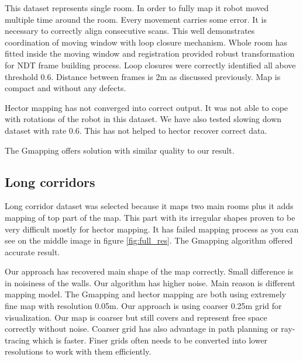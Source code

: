 This dataset represents single room. In order to fully map it robot moved multiple time around the room. Every movement carries some error. It is necessary to correctly align consecutive scans. This well demonstrates coordination of moving window with loop closure mechanism. Whole room has fitted inside the moving window and registration provided robust transformation for \gls{NDT} frame building process. Loop closures were correctly identified all above threshold 0.6. Distance between frames is 2m as discussed previously. Map is compact and without any defects.

Hector mapping has not converged into correct output. It was not able to cope with rotations of the robot in this dataset. We have also tested slowing down dataset with rate 0.6. This has not helped to hector recover correct data.

The Gmapping offers  solution with similar quality to our result. 

\newpage
\subsection{Long corridors}
Long corridor dataset was selected because it maps two main rooms plus it adds mapping of top part of the map. This part with its irregular shapes proven to be very difficult mostly for hector mapping. It has failed mapping process as you can see on the middle image in figure \ref{fig:full_res}. The Gmapping algorithm offered accurate result.

Our approach has recovered main shape of the map correctly. Small difference is in noisiness of the walls. Our algorithm has higher noise. Main reason is different mapping model. The Gmapping and hector mapping are both using extremely fine map with resolution 0.05m. Our approach is using coarser 0.25m grid for visualization. Our map is coarser but still covers and represent free space correctly without noise. Coarser grid has also advantage in path planning or ray-tracing which is faster. Finer grids often needs to be converted into lower resolutions to work with them efficiently.

